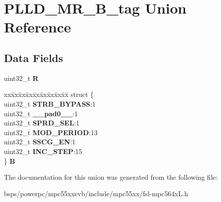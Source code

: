 \hypertarget{unionPLLD__MR__32B__tag}{}\section{P\+L\+L\+D\+\_\+\+M\+R\+\_\+B\+\_\+tag Union Reference}
\label{unionPLLD__MR__32B__tag}
\subsection*{Data Fields}
\begin{DoxyCompactItemize}
\item 
\mbox{\label{unionPLLD__MR__32B__tag_aec5789ed2177a3acb8ced0e8fa704390}} 
uint32\+\_\+t {\bfseries R}
\item 
\mbox{\label{unionPLLD__MR__32B__tag_a792ae5f0bc82d55f815dd97665811a13}} 
\begin{tabbing}
xx\=xx\=xx\=xx\=xx\=xx\=xx\=xx\=xx\=\kill
struct \{\\
\>uint32\_t {\bfseries STRB\_BYPASS}:1\\
\>uint32\_t {\bfseries \_\_pad0\_\_}:1\\
\>uint32\_t {\bfseries SPRD\_SEL}:1\\
\>uint32\_t {\bfseries MOD\_PERIOD}:13\\
\>uint32\_t {\bfseries SSCG\_EN}:1\\
\>uint32\_t {\bfseries INC\_STEP}:15\\
\} {\bfseries B}\\

\end{tabbing}\end{DoxyCompactItemize}


The documentation for this union was generated from the following file\+:\begin{DoxyCompactItemize}
\item 
bsps/powerpc/mpc55xxevb/include/mpc55xx/fsl-\/mpc564x\+L.\+h\end{DoxyCompactItemize}
